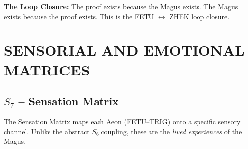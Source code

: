 \documentclass[11pt, letterpaper]{article}
\newcommand{\FETU}{\ensuremath{\mathop{\textnormal{\thaanafont\symbol{"23E3}}}}}   %
\newcommand{\ZHEK}{\ensuremath{\mathop{\textnormal{\symbolafont\symbol{"25C8}}}}}   %
\newcommand{\TRIG}{\ensuremath{\mathop{\textnormal{\tifinaghfont\symbol{"2D63}}}}}    %
\def\FETU{FETU}%
\def\ZHEK{ZHEK}%
\def\TRIG{TRIG}%
\begin{document}
\textbf{The Loop Closure:}
The proof exists because the Magus exists. The Magus exists because the proof exists. This is the \FETU{} $\longleftrightarrow$ \ZHEK{} loop closure.

\newpage
\section{SENSORIAL AND EMOTIONAL MATRICES}\label{sec:partXVIII}

\subsection{$S_{7}$ -- Sensation Matrix}\label{sec:19.1}

The Sensation Matrix maps each Aeon (\FETU--\TRIG) onto a specific sensory channel. Unlike the abstract $S_{6}$ coupling, these are the \textit{lived experiences} of the Magus.
\end{document}
